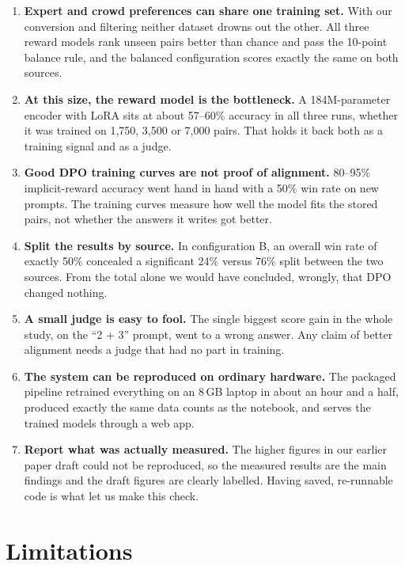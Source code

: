 \begin{enumerate}
  \item \textbf{Expert and crowd preferences can share one training set.} With our conversion and filtering neither dataset drowns out the other. All three reward models rank unseen pairs better than chance and pass the 10-point balance rule, and the balanced configuration scores exactly the same on both sources.
  \item \textbf{At this size, the reward model is the bottleneck.} A 184M-parameter encoder with LoRA sits at about 57--60\% accuracy in all three runs, whether it was trained on 1,750, 3,500 or 7,000 pairs. That holds it back both as a training signal and as a judge.
  \item \textbf{Good DPO training curves are not proof of alignment.} 80--95\% implicit-reward accuracy went hand in hand with a 50\% win rate on new prompts. The training curves measure how well the model fits the stored pairs, not whether the answers it writes got better.
  \item \textbf{Split the results by source.} In configuration B, an overall win rate of exactly 50\% concealed a significant 24\% versus 76\% split between the two sources. From the total alone we would have concluded, wrongly, that DPO changed nothing.
  \item \textbf{A small judge is easy to fool.} The single biggest score gain in the whole study, on the ``2 + 3'' prompt, went to a wrong answer. Any claim of better alignment needs a judge that had no part in training.
  \item \textbf{The system can be reproduced on ordinary hardware.} The packaged pipeline retrained everything on an 8\,GB laptop in about an hour and a half, produced exactly the same data counts as the notebook, and serves the trained models through a web app.
  \item \textbf{Report what was actually measured.} The higher figures in our earlier paper draft could not be reproduced, so the measured results are the main findings and the draft figures are clearly labelled. Having saved, re-runnable code is what let us make this check.
\end{enumerate}

\section{Limitations}
\label{sec:limitations}

